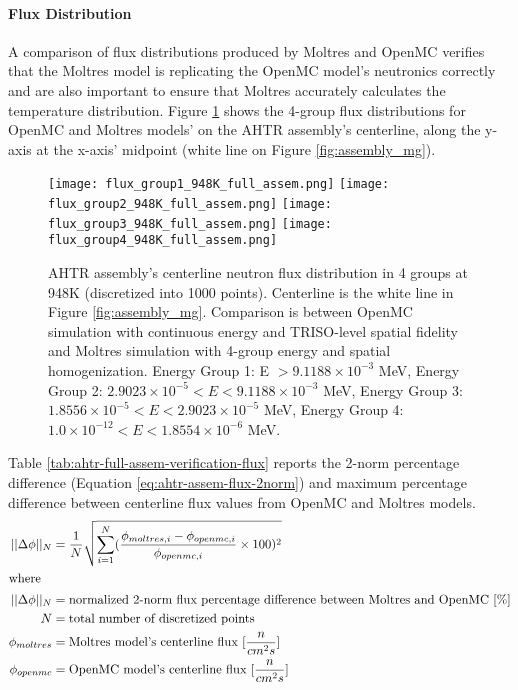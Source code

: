 \paragraph{Flux Distribution}
A comparison of flux distributions produced by Moltres and OpenMC verifies that the 
Moltres model is replicating the OpenMC model's neutronics correctly and are also 
important to ensure that Moltres accurately calculates the temperature distribution.
Figure \ref{fig:flux_948K_full_assem} shows the 4-group flux distributions for OpenMC and 
Moltres models' on the \gls{AHTR} assembly's centerline, along the y-axis at 
the x-axis' midpoint (white line on Figure \ref{fig:assembly_mg}). 
\begin{figure}[htbp]
    \centering
    \texttt{[image: flux\_group1\_948K\_full\_assem.png]} 
    \texttt{[image: flux\_group2\_948K\_full\_assem.png]} 
    \texttt{[image: flux\_group3\_948K\_full\_assem.png]} 
    \texttt{[image: flux\_group4\_948K\_full\_assem.png]} 
    \caption{\acrfull{AHTR} assembly's centerline neutron flux distribution 
    in 4 groups at 948K (discretized into 1000 points). 
    Centerline is the white line in Figure \ref{fig:assembly_mg}.
    Comparison is between OpenMC simulation with continuous energy 
    and TRISO-level spatial fidelity and Moltres simulation with 4-group energy and 
    spatial homogenization.
    Energy Group 1: E $> 9.1188 \times 10^{-3}$ MeV, 
    Energy Group 2: $2.9023 \times 10^{-5} < E < 9.1188 \times 10^{-3}$ MeV,
    Energy Group 3:  $1.8556 \times 10^{-5} < E < 2.9023 \times 10^{-5}$ MeV,
    Energy Group 4:  $1.0 \times 10^{-12} < E < 1.8554 \times 10^{-6}$ MeV.}
    \label{fig:flux_948K_full_assem}
\end{figure}
Table \ref{tab:ahtr-full-assem-verification-flux} reports the 2-norm percentage 
difference (Equation \ref{eq:ahtr-assem-flux-2norm}) and maximum percentage 
difference between centerline flux values from OpenMC and Moltres models. 
\begin{align}
    \label{eq:ahtr-assem-flux-2norm}
    ||\Delta \phi||_N &= \frac{1}{N}\sqrt{\sum_{i=1}^N(\frac{\phi_{moltres, i} - \phi_{openmc, i}}{\phi_{openmc, i}}\times100)^2} \\
\intertext{where}
    ||\Delta \phi||_N &= \mbox{normalized 2-norm flux percentage difference between Moltres and OpenMC } [\%] \nonumber \\
    N &= \mbox{total number of discretized points} \nonumber \\
    \phi_{moltres} &= \mbox{Moltres model's centerline flux } [\frac{n}{cm^2s}] \nonumber \\
    \phi_{openmc} &= \mbox{OpenMC model's centerline flux } [\frac{n}{cm^2s}] \nonumber 
\end{align} 
